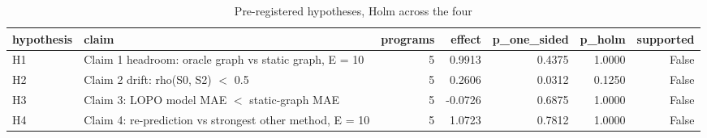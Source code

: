 \begin{table}[t]
\centering
\caption{Pre-registered hypotheses, Holm across the four}
\label{tab:v3-1-primary-hypotheses}
\begin{tabular}{llrrrrr}
\toprule
hypothesis & claim & programs & effect & p\_one\_sided & p\_holm & supported \\
\midrule
H1 & Claim 1 headroom: oracle graph vs static graph, E = 10 & 5 & 0.9913 & 0.4375 & 1.0000 & False \\
H2 & Claim 2 drift: rho(S0, S2) $<$ 0.5 & 5 & 0.2606 & 0.0312 & 0.1250 & False \\
H3 & Claim 3: LOPO model MAE $<$ static-graph MAE & 5 & -0.0726 & 0.6875 & 1.0000 & False \\
H4 & Claim 4: re-prediction vs strongest other method, E = 10 & 5 & 1.0723 & 0.7812 & 1.0000 & False \\
\bottomrule
\end{tabular}
\end{table}
